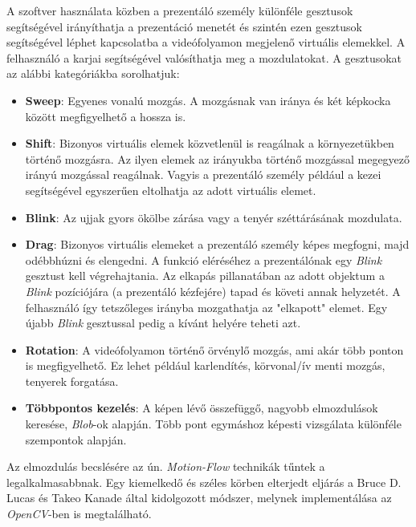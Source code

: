 

A szoftver használata közben a prezentáló személy különféle gesztusok segítségével irányíthatja a prezentáció menetét és szintén ezen gesztusok segítségével léphet kapcsolatba a videófolyamon megjelenő virtuális elemekkel. A felhasználó a karjai segítségével valósíthatja meg a mozdulatokat. A gesztusokat az alábbi kategóriákba sorolhatjuk:

\begin{itemize}
\item \textbf{Sweep}: Egyenes vonalú mozgás. A mozgásnak van iránya és két képkocka között megfigyelhető a hossza is.
\item \textbf{Shift}: Bizonyos virtuális elemek közvetlenül is reagálnak a környezetükben történő mozgásra. Az ilyen elemek az irányukba történő mozgással megegyező irányú mozgással reagálnak. Vagyis a prezentáló személy például a kezei segítségével egyszerűen eltolhatja az adott virtuális elemet.
\item \textbf{Blink}: Az ujjak gyors ökölbe zárása vagy a tenyér széttárásának mozdulata.
\item \textbf{Drag}: Bizonyos virtuális elemeket a prezentáló személy képes megfogni, majd odébbhúzni és elengedni. A funkció eléréséhez a prezentálónak egy \textit{Blink} gesztust kell végrehajtania. Az elkapás pillanatában az adott objektum a \textit{Blink} pozíciójára (a prezentáló kézfejére) tapad és követi annak helyzetét. A felhasználó így tetszőleges irányba mozgathatja az "elkapott" elemet. Egy újabb \textit{Blink} gesztussal pedig a kívánt helyére teheti azt.
\item \textbf{Rotation}: A videófolyamon történő örvénylő mozgás, ami akár több ponton is megfigyelhető. Ez lehet például karlendítés, körvonal/ív menti mozgás, tenyerek forgatása.
\item \textbf{Többpontos kezelés}: A képen lévő összefüggő, nagyobb elmozdulások keresése, \textit{Blob}-ok alapján. Több pont egymáshoz képesti vizsgálata különféle szempontok alapján.
\end{itemize}


Az elmozdulás becslésére az ún. \textit{Motion-Flow} technikák tűntek a legalkalmasabbnak. Egy kiemelkedő és széles körben elterjedt eljárás a Bruce D. Lucas és Takeo Kanade által kidolgozott módszer, melynek implementálása az \textit{OpenCV}-ben is megtalálható.

